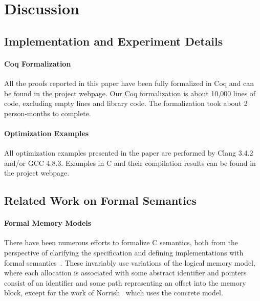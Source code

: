\section{Discussion}
\label{sec:intptrcast:discussion}

\subsection{Implementation and Experiment Details}

\paragraph{Coq Formalization}
All the proofs reported in this paper have been fully formalized in
Coq and can be found in the project webpage.  Our Coq formalization is about 10,000 lines of code,
excluding empty lines and library code.  The formalization took about 2
person-months to complete.

\paragraph{Optimization Examples}
All optimization examples presented in the paper are performed by Clang
3.4.2 and/or GCC 4.8.3.  Examples in C and their compilation
results can be found in the project webpage.


\subsection{Related Work on Formal Semantics}

\paragraph{Formal Memory Models}
There have been numerous efforts to formalize C semantics, both from
the perspective of clarifying the specification and defining
implementations with formal semantics~\cite{norrish1998c,leroy:compcert,ellison2012executable,krebbers2011formalization,Greenaway:2014:DSS:2594291.2594296}. These invariably use
variations of the logical memory model, where each allocation is
associated with some abstract identifier and pointers consist of
an identifier and some path representing an offset into the memory
block, except for the work of Norrish~\cite{norrish1998c} which uses the concrete model.

